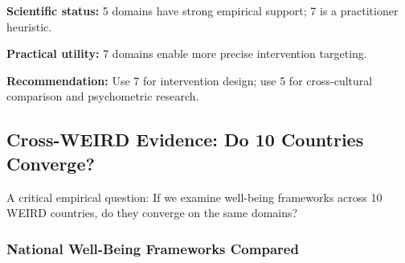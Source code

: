 \begin{tcolorbox}[colback=blue!5!white, colframe=blue!75!black, title=BCM Position]
\textbf{Scientific status:} 5 domains have strong empirical support; 7 is a practitioner heuristic.

\textbf{Practical utility:} 7 domains enable more precise intervention targeting.

\textbf{Recommendation:} Use 7 for intervention design; use 5 for cross-cultural comparison and psychometric research.
\end{tcolorbox}


\subsection{Cross-WEIRD Evidence: Do 10 Countries Converge?}
\label{sec:bj-cross-weird}

A critical empirical question: If we examine well-being frameworks across 10 WEIRD countries, do they converge on the same domains?

\subsubsection{National Well-Being Frameworks Compared}

